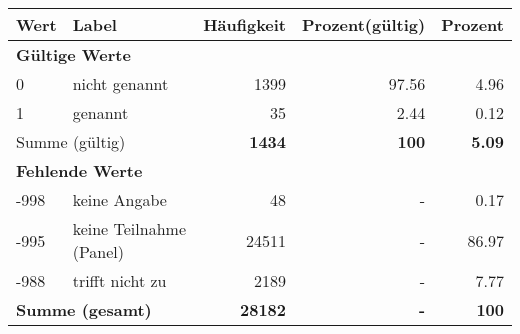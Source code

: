      \begin{longtable}{lXrrr}
     \toprule
     \textbf{Wert} & \textbf{Label} & \textbf{Häufigkeit} & \textbf{Prozent(gültig)} & \textbf{Prozent} \\
     \endhead
     \midrule
     \multicolumn{5}{l}{\textbf{Gültige Werte}}\\

     0 &
     \multicolumn{1}{X}{ nicht genannt   } &


       \num{1399} &
       \num[round-mode=places,round-precision=2]{97,56} &
         \num[round-mode=places,round-precision=2]{4,96} \\

     1 &
     \multicolumn{1}{X}{ genannt   } &


       \num{35} &
       \num[round-mode=places,round-precision=2]{2,44} &
         \num[round-mode=places,round-precision=2]{0,12} \\
     \midrule
     \multicolumn{2}{l}{Summe (gültig)} &
       \textbf{\num{1434}} &
     \textbf{100} &
       \textbf{\num[round-mode=places,round-precision=2]{5,09}} \\
     \multicolumn{5}{l}{\textbf{Fehlende Werte}}\\
       -998 &
       keine Angabe &
         \num{48} &
        - &
         \num[round-mode=places,round-precision=2]{0,17} \\
       -995 &
       keine Teilnahme (Panel) &
         \num{24511} &
        - &
         \num[round-mode=places,round-precision=2]{86,97} \\
       -988 &
       trifft nicht zu &
         \num{2189} &
        - &
         \num[round-mode=places,round-precision=2]{7,77} \\
     \midrule
     \multicolumn{2}{l}{\textbf{Summe (gesamt)}} &
          \textbf{\num{28182}} &
        \textbf{-} &
        \textbf{100} \\
     \bottomrule
     \end{longtable}
     

